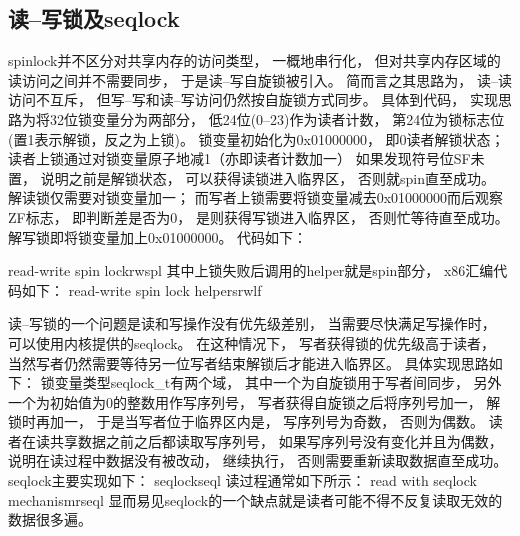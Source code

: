 \subsection{读--写锁及seqlock}
spinlock并不区分对共享内存的访问类型，
一概地串行化，
但对共享内存区域的读访问之间并不需要同步，
于是读--写自旋锁被引入。
简而言之其思路为，
读--读访问不互斥，
但写--写和读--写访问仍然按自旋锁方式同步。
具体到代码，
实现思路为将32位锁变量分为两部分，
低24位(0--23)作为读者计数，
第24位为锁标志位(置1表示解锁，反之为上锁)。
锁变量初始化为0x01000000，
即0读者解锁状态；
读者上锁通过对锁变量原子地减1（亦即读者计数加一）%
如果发现符号位SF未置，
说明之前是解锁状态，
可以获得读锁进入临界区，
否则就spin直至成功。
解读锁仅需要对锁变量加一；
而写者上锁需要将锁变量减去0x01000000而后观察ZF标志，
即判断差是否为0，
是则获得写锁进入临界区，
否则忙等待直至成功。
解写锁即将锁变量加上0x01000000。
代码如下：

              {read-write spin lock}{rwspl}
其中上锁失败后调用的helper就是spin部分，
x86汇编代码如下：
              {read-write spin lock helpers}{rwlf}

读--写锁的一个问题是读和写操作没有优先级差别，
当需要尽快满足写操作时，
可以使用内核提供的seqlock。
在这种情况下，
写者获得锁的优先级高于读者，
当然写者仍然需要等待另一位写者结束解锁后才能进入临界区。
具体实现思路如下：
锁变量类型seqlock\_t有两个域，
其中一个为自旋锁用于写者间同步，
另外一个为初始值为0的整数用作写序列号，
写者获得自旋锁之后将序列号加一，
解锁时再加一，
于是当写者位于临界区内是，
写序列号为奇数，
否则为偶数。
读者在读共享数据之前之后都读取写序列号，
如果写序列号没有变化并且为偶数，
说明在读过程中数据没有被改动，
继续执行，
否则需要重新读取数据直至成功。
seqlock主要实现如下：
              {seqlock}{seql}
读过程通常如下所示：
              {read with seqlock mechanism}{rseql}
显而易见seqlock的一个缺点就是读者可能不得不反复读取无效的数据很多遍。

